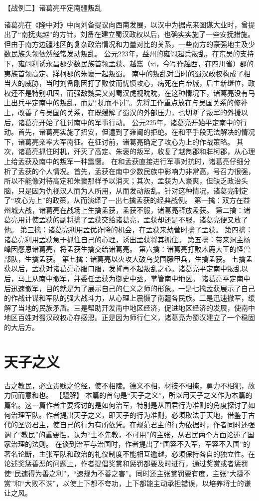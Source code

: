 \documentclass[a4paper,12pt,UTF8,twoside]{ctexbook}
\begin{document}
【战例二】诸葛亮平定南疆叛乱

诸葛亮在《隆中对》中向刘备提议向西南发展，以汉中为据点来图谋大业时，曾提出了“南抚夷越”的方针，刘备在建立蜀汉政权以后，也确实实施了一些安抚措施。但由于南方边疆地区的复杂政治情况和力量对比的关系，一些南方的豪强地主及少数民族头领依然经常发动叛乱。
公元223年，益州的雍闿起兵叛乱，在东吴的支持下，雍闿利诱永昌郡少数民族首领孟获、越巂（xī，今写作越西，在四川省）郡的夷族首领高定、牂柯郡的朱褒一起叛蜀。
南中的叛乱对当时的蜀汉政权构成了相当大的威胁，当时刘备刚因打了败仗而忧愤攻心，病死在白帝城，后主新继位，政权还不是特别巩固，而强敌魏吴又对蜀汉虎视眈眈，在这种情况下，诸葛亮没有马上出兵平定南中的叛乱，而是“抚而不讨”。先将工作重点放在与吴国关系的修补上，改善了与吴国的关系，在既缓解了蜀汉的外部压力，也切断了叛军的外援以后，诸葛亮开始了征讨南中的军事行动。
公元225年，诸葛亮开始平定南中的行动。首先，诸葛亮实施了招安，但遭到了雍闿的拒绝。在和平手段无法解决的情况下，诸葛亮亲率大军南征。在征讨前，诸葛亮确定了攻心为上的作战策略。
其次，诸葛亮抓住时机，歼灭了高定、朱褒的叛军，收复了越雋郡和牂柯郡，从心理上给孟获及南中的叛军一种震慑。
在和孟获直接进行军事对抗时，诸葛亮仔细分析了孟获的个人情况。首先，孟获在南中少数民族中影响力非常高，号召力很强，所以不能像对待高定和朱褒那样予以消灭；其次，孟获为人豪爽，但缺乏政治头脑，只是因为仇视汉人而为人所用，从而发动叛乱。针对这种情况，诸葛亮制定了“攻心为上”的政策，从而演绎了一出七擒孟获的经典战例。
第一擒：双方在益州城大战，诸葛亮在战场上生擒孟获，孟获不服，诸葛亮释放孟获。
第二擒：诸葛亮用计使孟获的副将擒了孟获交给诸葛亮，孟获却还是不服，诸葛亮便又放了他。
第三擒：诸葛亮利用孟优诈降的机会，在孟获来劫营时擒了孟获。
第四擒：诸葛亮利用孟获急于抓住自己的心理，诱出孟获将其抓住。
第五擒：带来洞主杨峰因感恩诸葛亮，将孟获生擒交给诸葛亮。
第六擒：诸葛亮打败木鹿大王的怪兽部队，生擒孟获。
第七擒：诸葛亮以火攻大破乌戈国藤甲兵，生擒孟获。
七擒孟获以后，孟获对诸葛亮心服口服，发誓再不起叛乱之心。诸葛亮平定南中叛乱以后，马上从南中撤军，并委任孟获为御史中丞，掌管南中地区。
诸葛亮平定南中后迅速撤军，目的就是为了展示自己的仁义之师的形象。一是七擒孟获展示了自己的作战计谋和军队的强大战斗力，从心理上震慑了南疆各民族。二是迅速撤军，缓解了当地的民族矛盾。三是帮助开发南中地区经济，促进地区经济的发展，使南中地区百姓对蜀汉政权心存感恩。正是因为师行仁义，诸葛亮为蜀汉建立了一个稳固的大后方。


\chapter{天子之义}

古之教民，必立贵贱之伦经，使不相陵。德义不相，材技不相掩，勇力不相犯，故力同而意和也。
【题解】
本篇的首句是“天子之义”，所以用天子之义作为本篇的篇名。这一篇作者主要探讨的是如何治军，特别是从国君行为准则的角度探讨了如何治理军队。作者提出天子之义，即天子的行为准则，必须取法于天地，借鉴于古代的圣贤君主，使自己的行为有所依凭。在规范君主的行为依据时，作者同时还强调了“教民”的重要性，认为“士不先教，不可用”的主张，从君民两个方面论述了国家治理的法则。
在谈到治军与治国时，作者提出了“国容不入军，军容不入国”的著名论断，主张军队和政治的礼仪制度不能相互逾越，必须保持各自的独立性。在论述奖惩善恶的问题上，作者提倡奖赏和惩罚都要及时进行，通过奖赏或者惩罚使“民速得为善之利”，“速规为不善之害”。同时还主张赏罚要有度，主张“大捷不赏”和“大败不诛”，以使上下都不夸功，上下都能主动承担错误，以培养将士的谦让之风。
\end{document}
